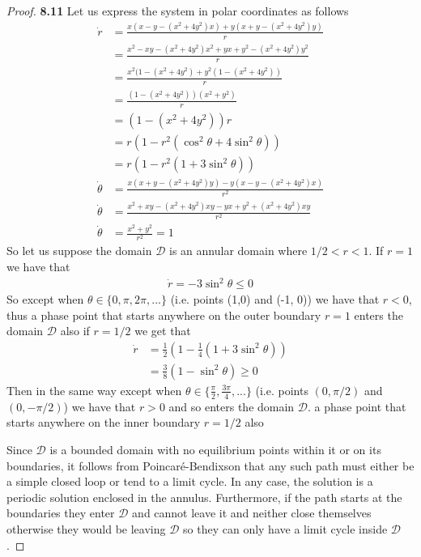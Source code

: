 \documentclass[11pt]{article}
\theoremstyle{definition}
\begin{document}
\begin{proof}{\textbf{8.11}}
        Let us express the system in polar coordinates as follows
        \begin{align*}
            \dot{r} &= \frac{x(x-y-(x^2 +4y^2)x) + y(x+y-(x^2+4y^2)y)}{r}\\
                &= \frac{x^2-xy-(x^2 +4y^2)x^2 + yx+y^2-(x^2+4y^2)y^2}{r}\\
                &= \frac{x^2(1-(x^2 +4y^2) + y^2(1-(x^2+4y^2))}{r}\\
                &= \frac{(1-(x^2 +4y^2))(x^2 + y^2)}{r}\\
                &= (1-(x^2 +4y^2))r\\
                &= r(1 - r^2(\cos^2\theta + 4\sin^2\theta))\\
                &= r(1 - r^2(1 + 3\sin^2\theta))
        \end{align*}
        \begin{align*}
            \dot{\theta} &= \frac{x(x+y-(x^2 +4y^2)y) - y(x-y-(x^2+4y^2)x)}{r^2}\\
            \dot{\theta} &= \frac{x^2+xy-(x^2 +4y^2)xy - yx+y^2+(x^2+4y^2)xy}{r^2}\\
            \dot{\theta} &= \frac{x^2 +y^2}{r^2} = 1
        \end{align*}
        So let us suppose the domain $\mathcal{D}$ is an annular domain where
        $1/2<r<1$. If $r = 1$ we have that
        \begin{align*}
            \dot{r} = - 3\sin^2\theta \leq 0
        \end{align*}
        So except when $\theta \in \{0, \pi, 2\pi, ...\}$ (i.e. points (1,0)
        and (-1, 0)) we have that $r < 0$,
        thus a phase point that starts anywhere on the outer boundary $r =1$
        enters the domain $\mathcal{D}$
        also if $r = 1/2$ we get that
        \begin{align*}
            \dot{r} &= \frac{1}{2}(1 - \frac{1}{4}(1 + 3 \sin^2\theta))\\
                &= \frac{3}{8}(1 - \sin^2\theta) \geq 0
        \end{align*}
        Then in the same way except when $\theta \in \{\frac{\pi}{2}, \frac{3\pi}{4}, ...\}$
        (i.e. points $(0, \pi/2)$ and $(0, -\pi/2)$) we have that $r > 0$ and so
        enters the domain $\mathcal{D}$.
        a phase point that starts anywhere on the inner boundary $r = 1/2$ also

        Since $\mathcal{D}$ is a bounded domain with no equilibrium points
        within it or on its boundaries, it follows from Poincaré-Bendixson that
        any such path must either be a simple closed loop or tend to a limit
        cycle. In any case, the solution is a periodic solution enclosed in the
        annulus. Furthermore, if the path starts at the boundaries they enter
        $\mathcal{D}$ and cannot leave it and neither close themselves otherwise
        they would be leaving $\mathcal{D}$ so they can only have a limit cycle
        inside $\mathcal{D}$.
    \end{proof}
\end{document}
